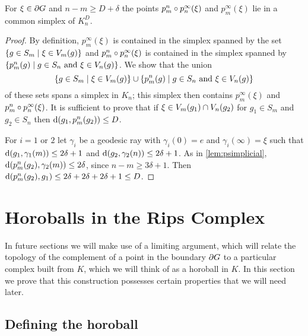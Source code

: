 \documentclass[a4paper]{article}
\begin{document}
\begin{lemma}
  For $\xi \in \partial G$ and $n - m \geq D + \delta$ the points $p^n_m
  \circ p^\infty_n (\xi)$ and $p^\infty_m(\xi)$ lie in a common simplex of
  $K_n^D$.
\end{lemma}

\begin{proof}
  By definition, $p^\infty_m(\xi)$ is contained in the simplex spanned by the set
  $\left\{g \in S_m \mid \xi \in V_m(g)\right\}$ and $p^n_m\circ p^\infty_n(\xi)$ is
  contained in the simplex spanned by $\{p^n_m(g) \mid g \in S_n \text{
  and } \xi \in V_n(g)\}$.  We show that the union
  \begin{equation*}
    \left\{g \in S_m \mid \xi \in V_m(g)\right\} \cup \{p^n_m(g) \mid g \in S_n \text{ and } \xi \in V_n(g)\}
  \end{equation*}
  of these sets spans a simplex in $K_n$; this simplex then contains
  $p^\infty_m(\xi)$ and $p^n_m\circ p^\infty_n(\xi)$.  It is sufficient to
  prove that if $\xi \in V_m(g_1) \cap V_n(g_2)$ for $g_1 \in S_m$ and
  $g_2 \in S_n$ then $\operatorname{d}(g_1, p^n_m(g_2)) \leq D$.

  For $i = 1$ or $2$ let $\gamma_i$ be a geodesic ray with $\gamma_i(0) = e$ and
  $\gamma_i(\infty) = \xi$ such that $\operatorname{d}(g_1, \gamma_1(m)) \leq 2\delta
  + 1$ and $\operatorname{d}(g_2, \gamma_2(n)) \leq 2\delta+1$.  As in
  \cref{lem:psimplicial}, $\operatorname{d}(p^n_m(g_2), \gamma_2(m)) \leq
  2\delta$, since $n-m \geq 3\delta+1$.  Then $\operatorname{d}(p^n_m(g_2), g_1) \leq
  2\delta + 2\delta + 2\delta+1 \leq D$.
\end{proof}

\section{Horoballs in the Rips Complex}

In future sections we will make use of a limiting argument, which will relate
the topology of the complement of a point in the boundary $\partial G$ to a
particular complex built from $K$, which we will think of as a horoball in $K$.
In this section we prove that this construction possesses certain properties
that we will need later.

\subsection{Defining the horoball}\label{sec:horoball}
\end{document}
